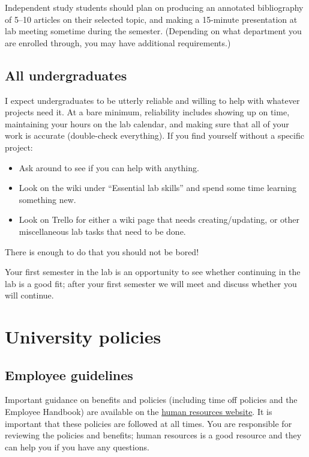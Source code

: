 \documentclass[letterpaper,12pt,oneside]{memoir}
\begin{document}
Independent study students should plan on producing an annotated bibliography of 5--10 articles on their selected topic, and making a 15-minute presentation at lab meeting sometime during the semester. (Depending on what department you are enrolled through, you may have additional requirements.)



\subsection{All undergraduates}

I expect undergraduates to be utterly reliable and willing to help with whatever projects need it. At a bare minimum, reliability includes showing up on time, maintaining your hours on the lab calendar, and making sure that all of your work is accurate (double-check everything). If you find yourself without a specific project:

\begin{itemize}
\item Ask around to see if you can help with anything.
\item Look on the wiki under ``Essential lab skills'' and spend some time learning something new.
\item Look on Trello for either a wiki page that needs creating/updating, or other miscellaneous lab tasks that need to be done.
\end{itemize}

There is enough to do that you should not be bored!

Your first semester in the lab is an opportunity to see whether continuing in the lab is a good fit; after your first semester we will meet and discuss whether you will continue.

\section{University policies}

\subsection{Employee guidelines}
Important guidance on benefits and policies (including time off policies and the Employee Handbook) are available on the \href{https://www.temple.edu/faculty-and-staff/working-temple/human-resources}{human resources website}. It is important that these policies are followed at all times. You are responsible for reviewing the policies and benefits; human resources is a good resource and they can help you if you have any questions.
\end{document}
